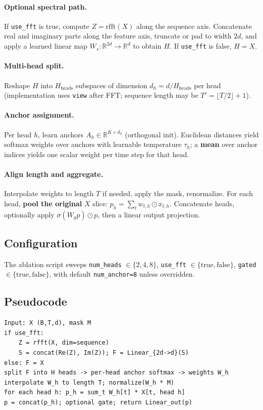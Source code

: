 \documentclass[11pt]{article}
\begin{document}
\paragraph{Optional spectral path.} If \texttt{use\_fft} is true, compute $Z = \mathrm{rfft}(X)$ along the sequence axis. Concatenate real and imaginary parts along the feature axis, truncate or pad to width $2d$, and apply a learned linear map $W_s : \mathbb{R}^{2d} \to \mathbb{R}^{d}$ to obtain $H$. If \texttt{use\_fft} is false, $H = X$.

\paragraph{Multi-head split.} Reshape $H$ into $H_{\text{heads}}$ subspaces of dimension $d_h = d / H_{\text{heads}}$ per head (implementation uses \texttt{view} after FFT; sequence length may be $T' = \lfloor T/2 \rfloor + 1$).

\paragraph{Anchor assignment.} Per head $h$, learn anchors $A_h \in \mathbb{R}^{K \times d_h}$ (orthogonal init). Euclidean distances yield softmax weights over anchors with learnable temperature $\tau_h$; a \textbf{mean} over anchor indices yields one scalar weight per time step for that head.

\paragraph{Align length and aggregate.} Interpolate weights to length $T$ if needed, apply the mask, renormalize. For each head, \textbf{pool the original} $X$ slice: $p_h = \sum_t w_{t,h} \odot x_{t,h}$. Concatenate heads, optionally apply $\sigma(W_g p) \odot p$, then a linear output projection.

\subsection{Configuration}
The ablation script sweeps \texttt{num\_heads} $\in \{2,4,8\}$, \texttt{use\_fft} $\in \{\text{true},\text{false}\}$, \texttt{gated} $\in \{\text{true},\text{false}\}$, with default \texttt{num\_anchor=8} unless overridden.

\subsection{Pseudocode}
\begin{verbatim}
Input: X (B,T,d), mask M
if use_fft:
    Z = rfft(X, dim=sequence)
    S = concat(Re(Z), Im(Z)); F = Linear_{2d->d}(S)
else: F = X
split F into H heads -> per-head anchor softmax -> weights W_h
interpolate W_h to length T; normalize(W_h * M)
for each head h: p_h = sum_t W_h[t] * X[t, head h]
p = concat(p_h); optional gate; return Linear_out(p)
\end{verbatim}
\end{document}

